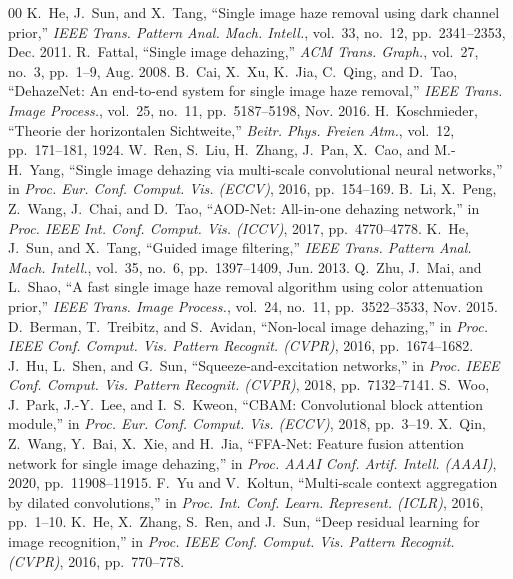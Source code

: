 \documentclass[journal]{IEEEtran}
\begin{document}
\FloatBarrier

\begin{thebibliography}{00}
 K.~He, J.~Sun, and X.~Tang, ``Single image haze removal using dark channel prior,'' \emph{IEEE Trans. Pattern Anal. Mach. Intell.}, vol.~33, no.~12, pp.~2341--2353, Dec. 2011.
 R.~Fattal, ``Single image dehazing,'' \emph{ACM Trans. Graph.}, vol.~27, no.~3, pp.~1--9, Aug. 2008.
 B.~Cai, X.~Xu, K.~Jia, C.~Qing, and D.~Tao, ``DehazeNet: An end-to-end system for single image haze removal,'' \emph{IEEE Trans. Image Process.}, vol.~25, no.~11, pp.~5187--5198, Nov. 2016.
 H.~Koschmieder, ``Theorie der horizontalen Sichtweite,'' \emph{Beitr. Phys. Freien Atm.}, vol.~12, pp.~171--181, 1924.
 W.~Ren, S.~Liu, H.~Zhang, J.~Pan, X.~Cao, and M.-H.~Yang, ``Single image dehazing via multi-scale convolutional neural networks,'' in \emph{Proc. Eur. Conf. Comput. Vis. (ECCV)}, 2016, pp.~154--169.
 B.~Li, X.~Peng, Z.~Wang, J.~Chai, and D.~Tao, ``AOD-Net: All-in-one dehazing network,'' in \emph{Proc. IEEE Int. Conf. Comput. Vis. (ICCV)}, 2017, pp.~4770--4778.
 K.~He, J.~Sun, and X.~Tang, ``Guided image filtering,'' \emph{IEEE Trans. Pattern Anal. Mach. Intell.}, vol.~35, no.~6, pp.~1397--1409, Jun. 2013.
 Q.~Zhu, J.~Mai, and L.~Shao, ``A fast single image haze removal algorithm using color attenuation prior,'' \emph{IEEE Trans. Image Process.}, vol.~24, no.~11, pp.~3522--3533, Nov. 2015.
 D.~Berman, T.~Treibitz, and S.~Avidan, ``Non-local image dehazing,'' in \emph{Proc. IEEE Conf. Comput. Vis. Pattern Recognit. (CVPR)}, 2016, pp.~1674--1682.
 J.~Hu, L.~Shen, and G.~Sun, ``Squeeze-and-excitation networks,'' in \emph{Proc. IEEE Conf. Comput. Vis. Pattern Recognit. (CVPR)}, 2018, pp.~7132--7141.
 S.~Woo, J.~Park, J.-Y.~Lee, and I.~S.~Kweon, ``CBAM: Convolutional block attention module,'' in \emph{Proc. Eur. Conf. Comput. Vis. (ECCV)}, 2018, pp.~3--19.
 X.~Qin, Z.~Wang, Y.~Bai, X.~Xie, and H.~Jia, ``FFA-Net: Feature fusion attention network for single image dehazing,'' in \emph{Proc. AAAI Conf. Artif. Intell. (AAAI)}, 2020, pp.~11908--11915.
 F.~Yu and V.~Koltun, ``Multi-scale context aggregation by dilated convolutions,'' in \emph{Proc. Int. Conf. Learn. Represent. (ICLR)}, 2016, pp.~1--10.
 K.~He, X.~Zhang, S.~Ren, and J.~Sun, ``Deep residual learning for image recognition,'' in \emph{Proc. IEEE Conf. Comput. Vis. Pattern Recognit. (CVPR)}, 2016, pp.~770--778.

\end{thebibliography}
\end{document}

